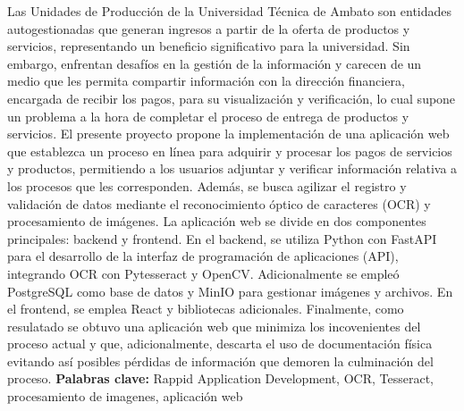 Las Unidades de Producción de la Universidad Técnica de Ambato son entidades
autogestionadas que generan ingresos a partir de la oferta de productos y servicios,
representando un beneficio significativo para la universidad. Sin embargo, enfrentan desafíos en la
gestión de la información y carecen de
un medio que les permita compartir información con la dirección financiera, encargada de
recibir los pagos, para su visualización y verificación, lo cual supone un problema a la
hora de completar el proceso de entrega de productos y servicios.
\bigbreak
El presente proyecto propone la implementación de una aplicación web que establezca un
proceso en línea para adquirir y procesar los pagos de servicios y productos,
permitiendo a los usuarios adjuntar y verificar información relativa a los
procesos que les corresponden. Además, se busca agilizar el registro y
validación de datos mediante el reconocimiento óptico de caracteres (OCR) y
procesamiento de imágenes.
\bigbreak
La aplicación web se divide en dos componentes principales: backend y frontend. En el
backend, se utiliza Python con FastAPI para el desarrollo de la interfaz de programación de aplicaciones
(API), integrando OCR con Pytesseract y OpenCV.
Adicionalmente se empleó PostgreSQL como base de datos y MinIO para gestionar imágenes y archivos.
En el frontend, se emplea React y bibliotecas adicionales.
\bigbreak
Finalmente, como resulatado se obtuvo una aplicación web que minimiza los incovenientes del proceso
actual y que, adicionalmente, descarta el uso de documentación física evitando así posibles pérdidas de
información que demoren la culminación del proceso.
\vfill
\textbf{Palabras clave:} Rappid Application Development, OCR, Tesseract, procesamiento de imagenes, aplicación web
